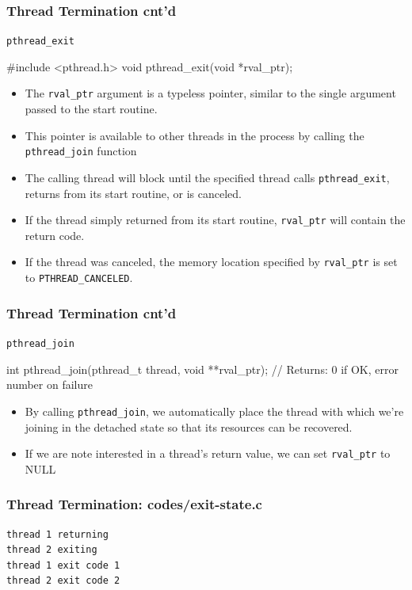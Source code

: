 \documentclass[newPxFont,sthlmFooter,nooffset]{beamer}
\begin{document}
\begin{frame}[fragile, t]
  \frametitle{Thread Termination cnt'd}
 \texttt{pthread\_exit}
\begin{codedef}
#include <pthread.h>
void pthread_exit(void *rval_ptr);
\end{codedef}

{\footnotesize
 \begin{itemize}
 \item The \texttt{rval\_ptr} argument is a typeless pointer, similar
   to the single argument passed to the start routine.
 \item This pointer is
   available to other threads in the process by calling the
   \texttt{pthread\_join} function
 \item The calling thread will block until the specified thread calls \texttt{pthread\_exit}, returns from its start routine, or is canceled.
 \item If the thread simply returned from its start routine, \texttt{rval\_ptr} will contain the return code.
 \item If the thread was canceled, the memory location specified by \texttt{rval\_ptr} is set to \texttt{PTHREAD\_CANCELED}.
 \end{itemize}
}

\end{frame}

\begin{frame}[fragile, t]
  \frametitle{Thread Termination cnt'd}
 \texttt{pthread\_join}
\begin{codedef}
int pthread_join(pthread_t thread, void **rval_ptr);
// Returns: 0 if OK, error number on failure
\end{codedef}

{\footnotesize
 \begin{itemize}
 \item By calling \texttt{pthread\_join}, we automatically place the thread with which we’re joining in the detached state so that its resources can be recovered.
 \item If we are note interested in a thread's return value, we can set \texttt{rval\_ptr} to NULL
 \end{itemize}
}

\end{frame}



\begin{frame}
  \frametitle{Thread Termination: codes/exit-state.c}



\begin{verbatim}
thread 1 returning
thread 2 exiting
thread 1 exit code 1
thread 2 exit code 2
\end{verbatim}

\end{frame}
\end{document}
